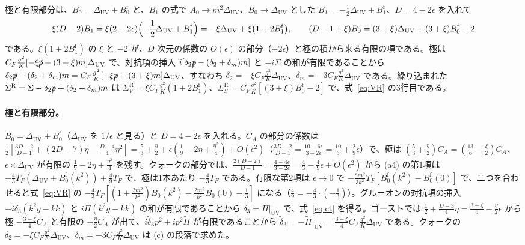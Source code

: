 \documentclass[a4paper,10pt]{ltjsarticle}
\newcommand{\DUV}{\Delta_{\mathrm{UV}}}
\begin{document}
極と有限部分は、$B_0=\DUV+B_0^{\mathrm f}$ と、$B_1$ の式で $A_0\to m^2\DUV$、$B_0\to\DUV$ とした $B_1=-\frac12\DUV+B_1^{\mathrm f}$、$D=4-2\epsilon$ を入れて
\begin{equation*}
\xi(D-2)B_1=\xi(2-2\epsilon)\Bigl(-\frac12\DUV+B_1^{\mathrm f}\Bigr)=-\xi\DUV+\xi\bigl(1+2B_1^{\mathrm f}\bigr),\qquad
(D-1+\xi)B_0=(3+\xi)\DUV+(3+\xi)B_0^{\mathrm f}-2
\end{equation*}
である。$\xi(1+2B_1^{\mathrm f})$ の $\xi$ と $-2$ が、$D$ 次元の係数の $O(\epsilon)$ の部分（$-2\epsilon$）と極の積から来る有限の項である。極は $C_F\frac{g^2}K[-\xi\slashed p+(3+\xi)m]\DUV$ で、対抗項の挿入 $i[\delta_2\slashed p-(\delta_2+\delta_m)m]$ と $-i\Sigma$ の和が有限であることから $\delta_2\slashed p-(\delta_2+\delta_m)m=C_F\frac{g^2}K[-\xi\slashed p+(3+\xi)m]\DUV$、すなわち $\delta_2=-\xi C_F\frac{g^2}K\DUV$、$\delta_m=-3C_F\frac{g^2}K\DUV$ である。繰り込まれた $\Sigma^{\mathrm R}=\Sigma-\delta_2\slashed p+(\delta_2+\delta_m)m$ は $\Sigma_V^{\mathrm R}=\xi C_F\frac{g^2}K(1+2B_1^{\mathrm f})$、$\Sigma_S^{\mathrm R}=C_F\frac{g^2}K[(3+\xi)B_0^{\mathrm f}-2]$ で、式~\eqref{eq:VR} の3行目である。

\paragraph{極と有限部分。}$B_0=\DUV+B_0^{\mathrm f}$（$\DUV$ を $1/\epsilon$ と見る）と $D=4-2\epsilon$ を入れる。$C_A$ の部分の係数は $\frac12[\frac{3D-2}{D-1}+(2D-7)\eta-\frac{D-4}4\eta^2]=\frac53+\frac\eta2+\epsilon(\frac19-2\eta+\frac{\eta^2}4)+O(\epsilon^2)$（$\frac{3D-2}{D-1}=\frac{10-6\epsilon}{3-2\epsilon}=\frac{10}3+\frac29\epsilon$）で、極は $(\frac53+\frac\eta2)C_A=(\frac{13}6-\frac\xi2)C_A$、$\epsilon\times\DUV$ が有限の $\frac19-2\eta+\frac{\eta^2}4$ を残す。クォークの部分では、$\frac{2(D-2)}{D-1}=\frac{4-4\epsilon}{3-2\epsilon}=\frac43-\frac49\epsilon+O(\epsilon^2)$ から (a4) の第1項は $-\frac43T_F(\DUV+B_0^{\mathrm f}(k^2))+\frac49T_F$ で、極は1本あたり $-\frac43T_F$ である。有限な第2項は $\epsilon\to0$ で $-\frac{8m^2}{3k^2}T_F[B_0^{\mathrm f}(k^2)-B_0^{\mathrm f}(0)]$ で、二つを合わせると式~\eqref{eq:VR} の $-\frac43T_F[(1+\frac{2m^2}{k^2})B_0(k^2)-\frac{2m^2}{k^2}B_0(0)-\frac13]$ になる（$\frac49=-\frac43\cdot(-\frac13)$）。グルーオンの対抗項の挿入 $-i\delta_3(k^2g-kk)$ と $i\Pi(k^2g-kk)$ の和が有限であることから $\delta_3=\Pi|_{\mathrm{UV}}$ で、式~\eqref{eq:ct} を得る。ゴーストでは $\frac12+\frac{D-3}4\eta=\frac{3-\xi}4-\frac{\eta}{2}\epsilon$ から極 $-\frac{3-\xi}4C_A$ と有限の $+\frac\eta2C_A$ が出て、$i\tilde\delta_3p^2+ip^2\tilde\Pi$ が有限であることから $\tilde\delta_3=-\tilde\Pi|_{\mathrm{UV}}=\frac{3-\xi}4C_A\frac{g^2}K\DUV$ である。クォークの $\delta_2=-\xi C_F\frac{g^2}K\DUV$、$\delta_m=-3C_F\frac{g^2}K\DUV$ は (c) の段落で求めた。
\end{document}
